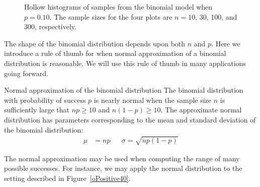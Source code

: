 \begin{figure}[h]
\centering
{}
\caption{Hollow histograms of samples from the binomial model when $p=0.10$. The sample sizes for the four plots are $n=10$, 30, 100, and 300, respectively.}
\label{fourBinomialModelsShowingApproxToNormal}
\end{figure}

The shape of the binomial distribution depends upon both $n$ and $p$.     Here we introduce a rule of thumb for when normal approximation of a binomial distribution is reasonable.  We will use this rule of thumb in many applications going forward.  

\begin{onebox}{Normal approximation of the binomial distribution}
The binomial distribution with probability of success $p$ is nearly normal when the sample size $n$ is sufficiently large that $np\ge 10$ and $n(1-p)\ge 10$. The approximate normal distribution has parameters corresponding to the mean and standard deviation of the binomial distribution:\vspace{-1.5mm}
\begin{align*}
\mu &= np
&&\sigma= \sqrt{np(1-p)}
\end{align*}\end{onebox}


The normal approximation may be used when computing the range of many possible successes. For instance, we may apply the normal distribution to the setting described in Figure~\ref{oPositive40}.



